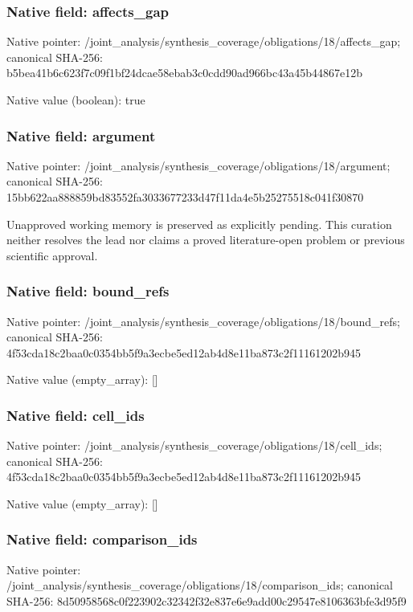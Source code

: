 \documentclass[10pt,a4paper]{article}
\begin{document}
\subsubsection{Native field: affects\_\allowbreak{}gap}
Native pointer: /joint\_\allowbreak{}analysis/synthesis\_\allowbreak{}coverage/obligations/18/affects\_\allowbreak{}gap; canonical SHA-256: b5bea41b6c623f7c09f1bf24dcae58ebab3c0cdd90ad966bc43a45b44867e12b

Native value (boolean): true

\subsubsection{Native field: argument}
Native pointer: /joint\_\allowbreak{}analysis/synthesis\_\allowbreak{}coverage/obligations/18/argument; canonical SHA-256: 15bb622aa888859bd83552fa3033677233d47f11da4e5b25275518c041f30870

\begingroup\raggedright\sloppy Unapproved working memory is preserved as explicitly pending. This curation neither resolves the lead nor claims a proved literature-open problem or previous scientific approval.\par\endgroup

\subsubsection{Native field: bound\_\allowbreak{}refs}
Native pointer: /joint\_\allowbreak{}analysis/synthesis\_\allowbreak{}coverage/obligations/18/bound\_\allowbreak{}refs; canonical SHA-256: 4f53cda18c2baa0c0354bb5f9a3ecbe5ed12ab4d8e11ba873c2f11161202b945

Native value (empty\_\allowbreak{}array): []

\subsubsection{Native field: cell\_\allowbreak{}ids}
Native pointer: /joint\_\allowbreak{}analysis/synthesis\_\allowbreak{}coverage/obligations/18/cell\_\allowbreak{}ids; canonical SHA-256: 4f53cda18c2baa0c0354bb5f9a3ecbe5ed12ab4d8e11ba873c2f11161202b945

Native value (empty\_\allowbreak{}array): []

\subsubsection{Native field: comparison\_\allowbreak{}ids}
Native pointer: /joint\_\allowbreak{}analysis/synthesis\_\allowbreak{}coverage/obligations/18/comparison\_\allowbreak{}ids; canonical SHA-256: 8d50958568c0f223902c32342f32e837e6e9add00c29547e8106363bfe3d95f9
\end{document}

